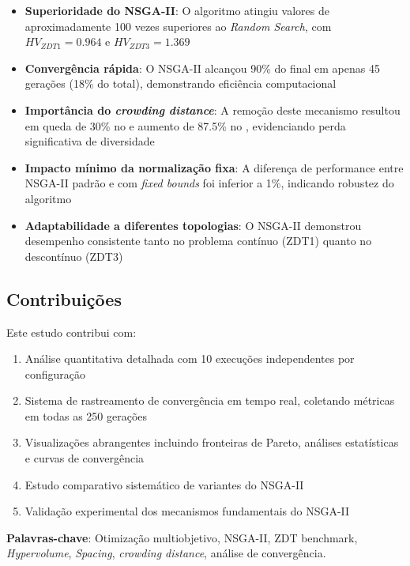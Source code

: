 \begin{itemize}
    \item \textbf{Superioridade do NSGA-II}: O algoritmo atingiu valores de \hlv{} aproximadamente 100 vezes superiores ao \textit{Random Search}, com $HV_{ZDT1} = 0.964$ e $HV_{ZDT3} = 1.369$
    
    \item \textbf{Convergência rápida}: O NSGA-II alcançou 90\% do \hlv{} final em apenas 45 gerações (18\% do total), demonstrando eficiência computacional
    
    \item \textbf{Importância do \textit{crowding distance}}: A remoção deste mecanismo resultou em queda de 30\% no \hlv{} e aumento de 87.5\% no \spac{}, evidenciando perda significativa de diversidade
    
    \item \textbf{Impacto mínimo da normalização fixa}: A diferença de performance entre NSGA-II padrão e com \textit{fixed bounds} foi inferior a 1\%, indicando robustez do algoritmo
    
    \item \textbf{Adaptabilidade a diferentes topologias}: O NSGA-II demonstrou desempenho consistente tanto no problema contínuo (ZDT1) quanto no descontínuo (ZDT3)
\end{itemize}

\subsection*{Contribuições}

Este estudo contribui com:

\begin{enumerate}
    \item Análise quantitativa detalhada com 10 execuções independentes por configuração
    \item Sistema de rastreamento de convergência em tempo real, coletando métricas em todas as 250 gerações
    \item Visualizações abrangentes incluindo fronteiras de Pareto, análises estatísticas e curvas de convergência
    \item Estudo comparativo sistemático de variantes do NSGA-II
    \item Validação experimental dos mecanismos fundamentais do NSGA-II
\end{enumerate}

\textbf{Palavras-chave}: Otimização multiobjetivo, NSGA-II, ZDT benchmark, \textit{Hypervolume}, \textit{Spacing}, \textit{crowding distance}, análise de convergência.

